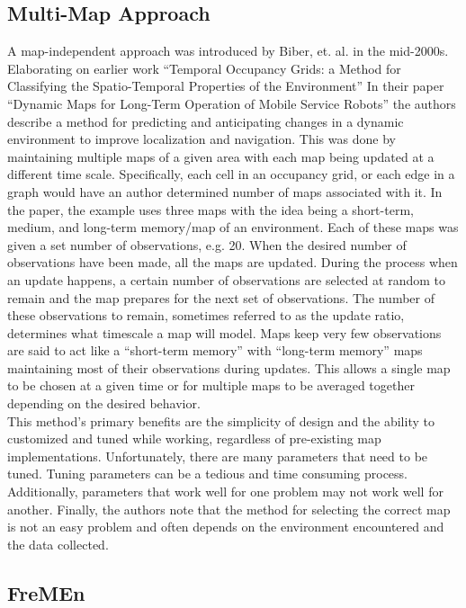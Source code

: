   \subsection{ Multi-Map Approach }
  A map-independent approach was introduced by Biber, et. al. in the mid-2000s.
  Elaborating on earlier work ``Temporal Occupancy Grids: a Method for
  Classifying the Spatio-Temporal Properties of the Environment''
  \cite{Arbuckle2002} In their paper ``Dynamic Maps for Long-Term Operation of Mobile Service Robots''
  the authors describe a method for predicting and anticipating changes in
  a dynamic environment to improve localization and navigation. This was done
  by maintaining multiple maps of a given area with each map
  being updated at a different time scale. Specifically, each cell in an occupancy
  grid, or each edge in a graph would have an author determined number of maps
  associated with it. In the paper, the example uses three maps with the
  idea being a short-term, medium, and long-term memory/map of an environment.
  Each of these maps was given a set number of observations, e.g. 20. When
  the desired number of observations have been made, all the maps are updated. During the process when
  an update happens, a certain number of observations are selected at random to
  remain and the map prepares for the next set of observations. The number of these
  observations to remain, sometimes referred to as the update ratio, determines
  what timescale a map will model. Maps keep very few observations are said to
  act like a ``short-term memory'' with ``long-term memory'' maps maintaining most of
  their observations during updates. This allows a single map to be chosen at a given
  time or for multiple maps to be averaged together depending on the desired behavior. \\

  This method's primary benefits are the simplicity of design and the ability to
  customized and tuned while working, regardless of pre-existing map
  implementations. Unfortunately, there are many parameters that need
  to be tuned. Tuning parameters can be a tedious and time consuming process.
  Additionally, parameters that work well for one problem may not work well for
  another. Finally, the authors note that the method for selecting
  the correct map is not an easy problem and often depends on the environment
  encountered and the data collected.


  \subsection{ FreMEn }

